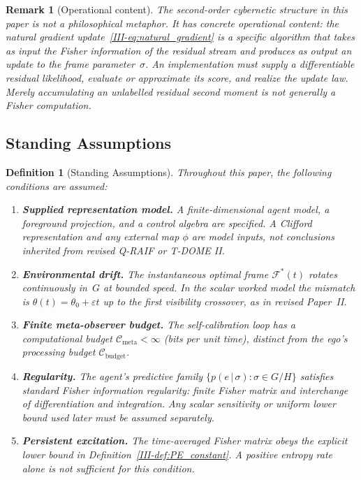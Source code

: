 \documentclass[12pt,a4paper,openany]{book}
\newtheorem{definition}[theorem]{Definition}
\newtheorem{remark}[theorem]{Remark}
\begin{document}
\begin{remark}[Operational content]
\label{III-rem:cybernetics_operational}
The second-order cybernetic structure in this paper is
\emph{not} a philosophical metaphor.
It has concrete operational content: the natural gradient
update~\eqref{III-eq:natural_gradient} is a specific algorithm
that takes as input the Fisher information of the residual
stream and produces as output an update to the frame
parameter~$\sigma$.
An implementation must supply a differentiable residual likelihood,
evaluate or approximate its score, and realize the update law.  Merely
accumulating an unlabelled residual second moment is not generally a
Fisher computation.
\end{remark}

\subsection{Standing Assumptions}
\label{III-subsec:standing_C}

\begin{definition}[Standing Assumptions]
\label{III-def:assumptions_C}
Throughout this paper, the following conditions are assumed:
\begin{enumerate}
\item[\textup{(C1)}] \textbf{Supplied representation model.}
  A finite-dimensional agent model, a foreground projection, and a
  control algebra are specified.  A Clifford representation and any
  external map $\phi$ are model inputs, not conclusions inherited from
  revised Q-RAIF or T-DOME II.
\item[\textup{(C2)}] \textbf{Environmental drift.}
  The instantaneous optimal frame
  $\mathcal{F}^*(t)$ rotates continuously in~$G$ at
  bounded speed.  In the scalar worked model the mismatch is
  $\theta(t)=\theta_0+\varepsilon t$ up to the first visibility
  crossover, as in revised Paper~II.
\item[\textup{(C3)}] \textbf{Finite meta-observer budget.}
  The self-calibration loop has a computational budget
  $\mathcal{C}_{\mathrm{meta}} < \infty$ (bits per unit
  time), distinct from the ego's processing budget
  $\mathcal{C}_{\mathrm{budget}}$.
\item[\textup{(C4)}] \textbf{Regularity.}
  The agent's predictive family
  $\{p(e\,|\,\sigma)
  : \sigma \in G/H\}$ satisfies standard Fisher
  information regularity: finite Fisher matrix and interchange of
  differentiation and integration.  Any scalar sensitivity or uniform
  lower bound used later must be assumed separately.
\item[\textup{(C5)}] \textbf{Persistent excitation.}
  The time-averaged Fisher matrix obeys the explicit lower bound in
  Definition~\ref{III-def:PE_constant}.  A positive entropy rate alone is
  not sufficient for this condition.
\end{enumerate}
\end{definition}
\end{document}
